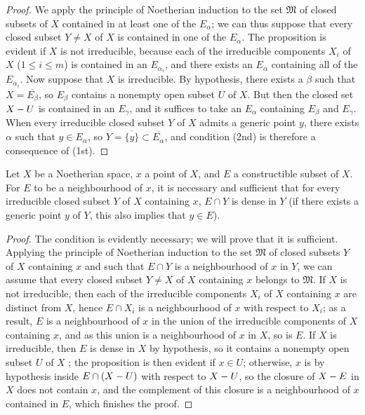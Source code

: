 \begin{proof}
We apply the principle of Noetherian induction  to the set $\mathfrak{M}$ of closed subsets of $X$ contained in at least one of the $E_\alpha$; we can thus suppose that every closed subset $Y\neq X$ of $X$ is contained in one of the $E_\alpha$.
The proposition is evident if $X$ is not irreducible, because each of the irreducible components $X_i$ of $X$ ($1\leq i\leq m$) is contained in an $E_{\alpha_i}$, and there exists an $E_\alpha$ containing all of the $E_{\alpha_i}$.
Now suppose that $X$ is irreducible.
By hypothesis, there exists a $\beta$ such that $X=\overline{E_\beta}$, so  $E_\beta$ contains a nonempty open subset $U$ of $X$.
But then the closed set $X- U$ is contained in an $E_\gamma$, and it suffices to take an $E_\alpha$ containing $E_\beta$ and $E_\gamma$.
When every irreducible closed subset $Y$ of $X$
admits a generic point $y$, there exists $\alpha$ such that $y\in E_\alpha$, so $Y=\overline{\{y\}}\subset\overline{E_\alpha}$, and condition (2nd) is therefore a consequence of (1st).
\end{proof}

\begin{proposition}[9.2.5]
\label{0.9.2.5}
Let $X$ be a Noetherian space, $x$ a point of $X$, and $E$ a constructible subset of $X$.
For $E$ to be a neighbourhood of $x$, it is necessary and sufficient that for every irreducible closed subset $Y$ of $X$ containing $x$, $E\cap Y$ is dense in $Y$ (if there exists a generic point $y$ of $Y$, this also implies  that $y\in E$).
\end{proposition}

\begin{proof}
The condition is evidently necessary; we will prove that it is sufficient.
Applying the principle of Noetherian induction to the set $\mathfrak{M}$ of closed subsets $Y$ of $X$ containing $x$ and such that $E\cap Y$ is a neighbourhood of $x$ in $Y$, we can assume that every closed subset $Y\neq X$ of $X$ containing $x$ belongs to $\mathfrak{M}$.
If $X$ is not irreducible, then each of the irreducible components $X_i$ of $X$ containing $x$ are distinct from $X$, hence $E\cap X_i$ is a neighbourhood of $x$ with respect to $X_i$; as a result, $E$ is a neighbourhood of $x$ in the union of the irreducible components of $X$ containing $x$, and as this union is a neighbourhood of $x$ in $X$, so is $E$.
If $X$ is irreducible, then $E$ is dense in $X$ by hypothesis, so it contains a nonempty open subset $U$ of $X$ ; the proposition is then evident if $x\in U$; otherwise, $x$ is by hypothesis inside $E\cap(X- U)$ with respect to $X- U$, so the closure of $X- E$ in $X$ does not contain $x$, and the complement of this closure is a neighbourhood of $x$ contained in $E$, which finishes the proof.
\end{proof}

